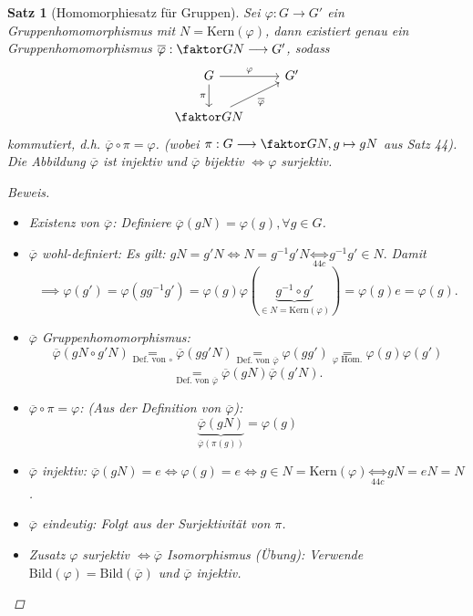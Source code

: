 \documentclass[a4paper]{article}
\theoremstyle{plain}
\newtheorem{satz}[thm]{Satz}
\theoremstyle{definition}
\begin{document}
\begin{satz}[Homomorphiesatz für Gruppen]
  Sei $\varphi: G \to G'$ ein Gruppenhomomorphismus mit $N = \mathrm{Kern}(\varphi)$, dann existiert genau ein Gruppenhomomorphismus $\overline \varphi : \faktor GN \longrightarrow G'$, sodass
  $$
\begin{tikzcd}
G \arrow[r, "\varphi"] \arrow[d, "\pi"'] & G' \\
\faktor GN \arrow[ru, "\overline \varphi"']               &
\end{tikzcd}
$$
kommutiert, d.h. $\overline \varphi \circ \pi = \varphi$. (wobei $\pi : G \longrightarrow \faktor GN, g \mapsto gN$ aus Satz 44). Die Abbildung $\overline \varphi$ ist injektiv und $\overline \varphi$ bijektiv $\iff \varphi$ surjektiv.
\begin{proof}[Beweis]
\begin{itemize}
  \item Existenz von $\overline \varphi$: Definiere $\overline\varphi(gN) = \varphi(g), \forall g \in G$.
  \item $\overline\varphi$ wohl-definiert: Es gilt: $gN = g'N \iff N = g^{-1}g'N \underset{44c}\iff g^{-1}g' \in N.$ Damit $$\implies \varphi(g') = \varphi(gg^{-1}g') = \varphi(g)\varphi(\underbrace{g^{-1} \circ g'}_{\in N = \mathrm{Kern}(\varphi)}) = \varphi(g)e = \varphi(g).$$
  \item $\overline\varphi$ Gruppenhomomorphismus: $$\overline\varphi(gN \circ g'N)\underset{\text{Def. von } \circ} = \overline\varphi(gg'N) \underset{\text{Def. von } \overline\varphi} =  \varphi(gg') \underset{\varphi \text{ Hom.}} = \varphi(g)\varphi(g')$$
        $$\underset{\text{Def. von } \overline\varphi} =\overline\varphi(gN)\overline\varphi(g'N).$$
\item $\overline\varphi \circ \pi = \varphi$: (Aus der Definition von $\overline\varphi$): $$\underbrace{\overline\varphi(gN)}_{\overline\varphi(\pi(g))} = \varphi(g)$$
\item $\overline\varphi$ injektiv: $\overline\varphi(gN) = e \iff \varphi(g)=e \iff g \in N = \mathrm{Kern}(\varphi) \underset{44c} \iff gN= eN = N$.
\item $\overline\varphi$ eindeutig: Folgt aus der Surjektivität von $\pi$.
\item Zusatz $\varphi$ surjektiv $\iff \overline\varphi$ Isomorphismus (Übung): Verwende $\mathrm{Bild}(\varphi) = \mathrm{Bild}(\overline\varphi)$ und $\overline\varphi$ injektiv.
\end{itemize}
\end{proof}
\end{satz}
\end{document}
